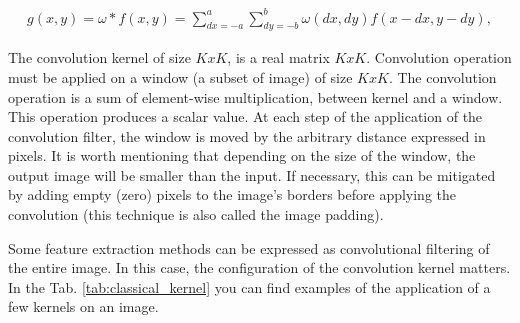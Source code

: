 \begin{align*}
g(x,y)= \omega *f(x,y)=\sum_{dx=-a}^a{\sum_{dy=-b}^b{ \omega (dx,dy)f(x-dx,y-dy)}},
\end{align*}

The convolution kernel of size $KxK$, is a real matrix $KxK$.
Convolution operation must be applied on a window (a subset of image) of size $KxK$.
The convolution operation is a sum of element-wise multiplication, between kernel and a window.
This operation produces a scalar value.
At each step of the application of the convolution filter, the window is moved by the arbitrary distance expressed in pixels.
It is worth mentioning that depending on the size of the window, the output image will be smaller than the input.
If necessary, this can be mitigated by adding empty (zero) pixels to the image's borders before applying the convolution (this technique is also called the image padding).

Some feature extraction methods can be expressed as convolutional filtering of the entire image.
In this case, the configuration of the convolution kernel matters.
In the Tab. \ref{tab:classical_kernel} you can find examples of the application of a few kernels on an image.

